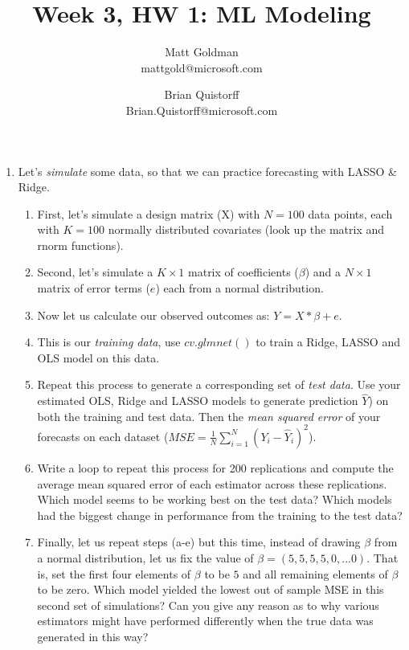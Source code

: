 \documentclass[11pt]{article}
\begin{document}
	
\title{Week 3, HW 1: ML Modeling}

\author{Matt Goldman \\ mattgold@microsoft.com \and Brian Quistorff \\ Brian.Quistorff@microsoft.com}

\maketitle




\begin{enumerate}
	\item Let's \textit{simulate} some data, so that we can practice forecasting with LASSO \& Ridge.
	\begin{enumerate}
		\item First, let's simulate a design matrix (X) with $N=100$ data points, each with $K=100$ normally distributed covariates (look up the matrix and rnorm functions).
		\item Second, let's simulate a $K \times 1$ matrix of coefficients ($\beta$) and a $N \times 1$ matrix of error terms ($e$) each from a normal distribution.
		\item Now let us calculate our observed outcomes as: $Y = X*\beta +e$.
		\item This is our \textit{training data}, use $cv.glmnet()$ to train a Ridge, LASSO and OLS model on this data.
		\item Repeat this process to generate a corresponding set of \textit{test data}. Use your estimated OLS, Ridge and LASSO models to generate prediction $\hat Y$) on both the training and test data. Then the \textit{mean squared error} of your forecasts on each dataset ($MSE = \frac{1}{N}\sum_{i=1}^N (Y_i - \hat Y_i)^2$).
		\item Write a loop to repeat this process for 200 replications and compute the average mean squared error of each estimator across these replications. Which model seems to be working best on the test data? Which models had the biggest change in performance from the training to the test data?
		\item Finally, let us repeat steps (a-e) but this time, instead of drawing $\beta$ from a normal distribution, let us fix the value of $\beta=(5,5,5,5,0,...0)$. That is, set the first four elements of $\beta$ to be $5$ and all remaining elements of $\beta$ to be zero. Which model yielded the lowest out of sample MSE in this second set of simulations? Can you give any reason as to why various estimators might have performed differently when the true data was generated in this way?

\end{enumerate}
\end{enumerate}
\end{document}
